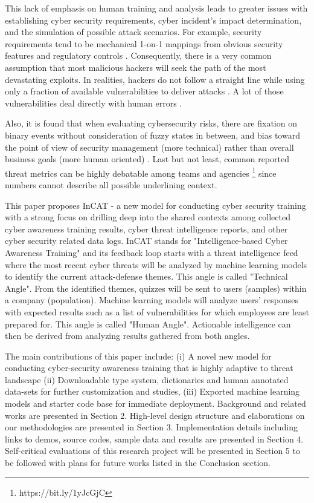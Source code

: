 \documentclass[conference]{IEEEtran}
\begin{document}
This lack of emphasis on human training and analysis leads to greater issues with establishing cyber security requirements, cyber incident's impact determination, and the simulation of possible attack scenarios. For example, security requirements tend to be mechanical 1-on-1 mappings from obvious security features and regulatory controls \cite{Cleland-Huang2014HowGratae}. Consequently, there is a very common assumption that most malicious hackers will seek the path of the most devastating exploits. In realities, hackers do not follow a straight line while using only a fraction of available vulnerabilities to deliver attacks \cite{Allodi2017TowardsAssumptions}. A lot of those vulnerabilities deal directly with human errors \cite{Messaoud2017AdvancedChallenges}.

Also, it is found that when evaluating cybersecurity risks, there are fixation on binary events without consideration of fuzzy states in between, and bias toward the point of view of security management (more technical) rather than overall business goals (more human oriented) \cite{Dhillon2011Developer-drivenTrenches} \cite{Bayuk2013SecurityConstruct}. Last but not least, common reported threat metrics can be highly debatable among teams and agencies \footnote{https://bit.ly/1yJcGjC} since numbers cannot describe all possible underlining context. 

This paper proposes InCAT - a new model for conducting cyber security training with a strong focus on drilling deep into the shared contexts among collected cyber awareness training results, cyber threat intelligence reports, and other cyber security related data logs. InCAT stands for "Intelligence-based Cyber Awareness Training" and its feedback loop starts with a threat intelligence feed where the most recent cyber threats will be analyzed by machine learning models to identify the current attack-defense themes. This angle is called "Technical Angle". From the identified themes, quizzes will be sent to users (samples) within a company (population). Machine learning models will analyze users' responses with expected results such as a list of vulnerabilities for which employees are least prepared for. This angle is called "Human Angle". Actionable intelligence can then be derived from analyzing results gathered from both angles.

The main contributions of this paper include: (i) A novel new model for conducting cyber-security awareness training that is highly adaptive to threat landscape (ii) Downloadable type system, dictionaries and human annotated data-sets for further customization and studies, (iii) Exported machine learning models and starter code base for immediate deployment. Background and related works are presented in Section 2. High-level design structure and elaborations on our methodologies are presented in Section 3. Implementation details including links to demos, source codes, sample data and results are presented in Section 4. Self-critical evaluations of this research project will be presented in Section 5 to be followed with plans for future works listed in the Conclusion section.
\end{document}
